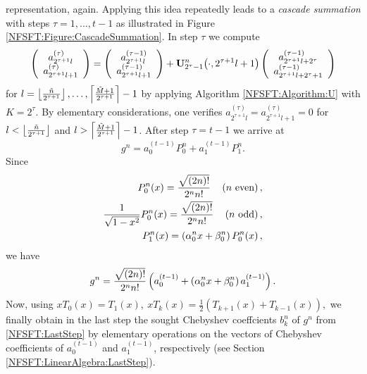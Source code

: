 representation, again. Applying this idea repeatedly leads to a \emph{cascade 
summation} with steps $\tau=1,\ldots,t-1$ as illustrated in Figure \ref{NFSFT:Figure:CascadeSummation}. 
In step $\tau$ we compute
\begin{equation}
  \label{NFSFT:GeneralStep}
  \left(\begin{array}{c}
    a_{2^{\tau+1}l}^{(\tau)}\\
    a_{2^{\tau+1}l+1}^{(\tau)} 
  \end{array}\right)
  =
  \left(\begin{array}{c}
    a_{2^{\tau+1}l}^{(\tau-1)}\\
    a_{2^{\tau+1}l+1}^{(\tau-1)} 
  \end{array}\right)
  + {\mathbf{U}_{2^{\tau}-1}^{n}{\hspace{-0.4ex}}\left(\cdot,2^{\tau+1}l+1\right)}
  \left(\begin{array}{c}
    a_{2^{\tau+1}l+2^{\tau}}^{(\tau-1)}\\
    a_{2^{\tau+1}l+2^{\tau}+1}^{(\tau-1)} 
  \end{array}\right)
\end{equation}
for $l=\left\lfloor\frac{\tilde{n}}{2^{\tau+1}}\right\rfloor,\ldots,\left\lceil\frac{\tilde{M}+1}{2^{\tau+1}}\right\rceil-1$
by applying Algorithm \ref{NFSFT:Algorithm:U} with $K=2^{\tau}$. By elementary considerations, one verifies
$a_{2^{\tau+1}l}^{(\tau)} = a_{2^{\tau+1}l+1}^{(\tau)} = 0$ for $l < \left\lfloor\frac{\tilde{n}}{2^{\tau+1}}\right\rfloor$ and 
$l > \left\lceil\frac{\tilde{M}+1}{2^{\tau+1}}\right\rceil-1$.
After step $\tau = t-1$ we arrive at
\begin{equation}
  \nonumber
  g^n = a_{0}^{(t-1)} P_{0}^{n} + a_{1}^{(t-1)} P_{1}^{n}.
\end{equation}
Since 
\begin{align}
  \nonumber
  P_{0}^n{\hspace{-0.4ex}}\left(x\right) = \frac{\sqrt{(2n)!}}{2^n n!} \quad \left(\text{$n$ even}\right),\\
  \nonumber
  \frac{1}{\sqrt{1-x^2}}P_{0}^n{\hspace{-0.4ex}}\left(x\right) = \frac{\sqrt{(2n)!}}{2^n n!} \quad \left(\text{$n$ odd}\right),\\
  P_{1}^n{\hspace{-0.4ex}}\left(x\right) = \left(\alpha_{0}^nx + \beta_{0}^n\right)P_{0}^n{\hspace{-0.4ex}}\left(x\right),
\end{align} 
we have
\begin{equation}
  \label{NFSFT:LastStep}
  g^n = \frac{\sqrt{(2n)!}}{2^n n!} \left(a_{0}^{(t-1)} + 
  \left(\alpha_{0}^nx + \beta_{0}^n\right) a_{1}^{(t-1)}\right).
\end{equation}
Now, using 
$%
  xT_{0}(x) = T_{1}(x),\ xT_{k}(x) = \frac{1}{2}\left( T_{k+1}(x) + T_{k-1}(x) \right),
$ %
we finally obtain in the last step the sought Chebyshev coeffcients $b_{k}^n$ of $g^n$ 
from \eqref{NFSFT:LastStep} by
elementary operations on the vectors of Chebyshev coefficients of $a_{0}^{(t-1)}$ and $a_{1}^{(t-1)}$, respectively 
(see Section \ref{NFSFT:LinearAlgebra:LastStep}).


